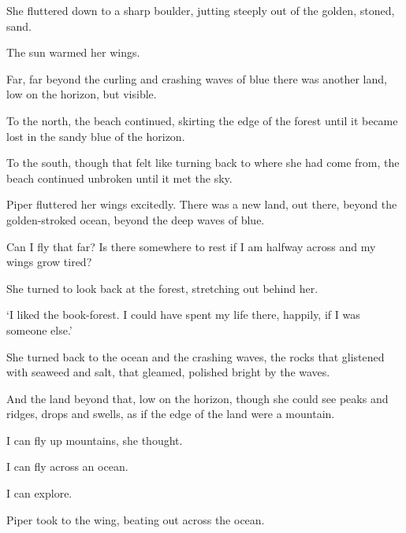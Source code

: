 She fluttered down to a sharp boulder, jutting steeply out of the
golden, stoned, sand.

The sun warmed her wings.

Far, far beyond the curling and crashing waves of blue there was
another land, low on the horizon, but visible.

To the north, the beach continued, skirting the edge of the forest
until it became lost in the sandy blue of the horizon.

To the south, though that felt like turning back to where she had come
from, the beach continued unbroken until it met the sky.

Piper fluttered her wings excitedly. There was a new land, out there,
beyond the golden-stroked ocean, beyond the deep waves of blue.

Can I fly that far? Is there somewhere to rest if I am halfway across
and my wings grow tired?

She turned to look back at the forest, stretching out behind her.

`I liked the book-forest. I could have spent my life there, happily,
if I was someone else.'

She turned back to the ocean and the crashing waves, the rocks that
glistened with seaweed and salt, that gleamed, polished bright by the
waves.

And the land beyond that, low on the horizon, though she could see
peaks and ridges, drops and swells, as if the edge of the land were a
mountain.

I can fly up mountains, she thought.

I can fly across an ocean.

I can explore.

Piper took to the wing, beating out across the ocean.


